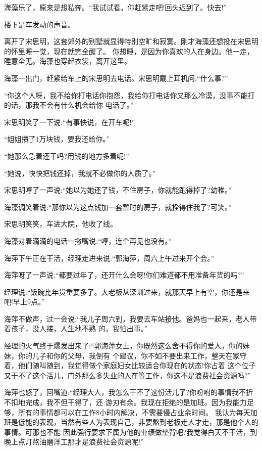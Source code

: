 \documentclass[11pt,a4paper,onecolumn]{article}
\begin{document}
海藻乐了，原来是想私奔。``我试试看。你赶紧走吧!回头迟到了。快去!''

楼下是车发动的声音。

离开了宋思明，这套郊外的别墅就显得特别空旷和寂寞。刚才海藻还想投在宋思明的怀里睡一觉，现在就完全醒了。
你想睡，是因为你喜欢的人在身边。他一走，睡意全无。海藻也穿起衣裳，离开这里。

海藻一出门，赶紧给车上的宋思明去电话。宋思明戴上耳机问:``什么事?''

``你这个人呀，我不给你打电话你抱怨，我给你打电话你又那么冷漠，没事不能打的话，那我不会有什么机会给你
电话了。''

宋思明笑了一下说:``有事快说，在开车呢!''

``姐姐攒了1万块钱，要我还给你。''

``她那么急着还干吗?用钱的地方多着呢!''

``她说，快快把钱还掉，我就不必做你的人质了。''

宋思明哼了一声说:``她以为她还了钱，不住房子，你就能跑得掉了?幼稚。''

海藻调笑着说:``那你以为这点钱加一套暂时的房子，就拴得住我了?可笑。''

宋思明笑笑，车进大院，他收了线。

海藻对着滴滴的电话一撇嘴说:``哼，连个再见也没有。''

海萍下午正在干活，经理走进来说:``郭海萍，周六上午过来开个会。''

海萍呀了一声说:``都要过年了，还开什么会呀!你们难道都不用准备年货的吗?''

经理说:``饭碗比年货重要多了。大老板从深圳过来，就那天早上有空，你还是来吧!早上9点。''

海萍不做声，过一会说:``我儿子周六到，我要去车站接他。爸妈也一起来，老人带着孩子，没人接，人生地不熟
的，我怕出事。''

经理的火气终于爆发出来了:``郭海萍女士，你既然这么舍不得你的爱人，你的妹妹，你的儿子和你的父母，我倒有
个建议，你不如不要出来工作，整天在家守着，他们随叫随到，我觉得做个家庭妇女比较适合你现在的状态!你占着
这个位子又干不了这个活儿，门外那么多失业的人在等工作，你这不是浪费社会资源吗?''

海萍也怒了，回嘴道:``经理大人，我怎么干不了这份活儿了?你吩咐的事情我不折不扣地完成，我不但干得了，还
游刃有余。我现在拒绝的是加班。因为我能力足够，所有的事情都可以在工作8小时内解决，不需要侵占业余时间。
我认为每天加班是低能的表现，当然有些人为表现自己，非要熬到老板走人才走，那是他个人的事情。可那也不能
因此强行要求下属为他的业绩做垫背吧?我觉得白天不干活，到晚上点灯熬油磨洋工那才是浪费社会资源呢!''
\end{document}
